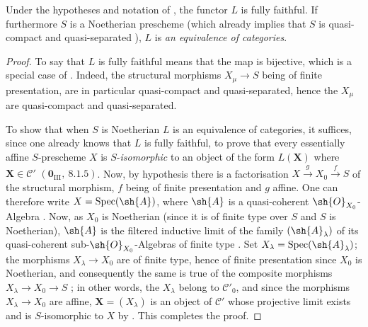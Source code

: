 \begin{proposition}[8.13.5]
\label{IV.8.13.5}
Under the hypotheses and notation of , the functor $L$ is fully faithful.
If furthermore $S$ is a Noetherian prescheme (which already implies that $S$ is quasi-compact and quasi-separated ), $L$ is \emph{an equivalence of categories}.
\end{proposition}

\begin{proof}
To say that $L$ is fully faithful means that the map  is bijective, which is a special case of .
Indeed, the structural morphisms $X_\mu\to S$ being of finite presentation, are in particular quasi-compact and quasi-separated, hence the $X_\mu$ are quasi-compact and quasi-separated.

To show that when $S$ is Noetherian $L$ is an equivalence of categories, it suffices, since one already knows that $L$ is fully faithful, to prove that every essentially affine $S$-prescheme $X$ is $S$-\emph{isomorphic} to an object of the form $L(\mathbf{X})$ where $\mathbf{X}\in\mathcal{C}'$ $(\mathbf{0}_{\text{III}},~8.1.5)$.
Now, by hypothesis there is a factorisation $X\xrightarrow{g}X_0\xrightarrow{f}S$ of the structural morphism, $f$ being of finite presentation and $g$ affine.
One can therefore write $X=\operatorname{Spec}(\sh{A})$, where $\sh{A}$ is a quasi-coherent $\sh{O}_{X_0}$-Algebra .
Now, as $X_0$ is Noetherian (since it is of finite type over $S$ and $S$ is Noetherian), $\sh{A}$ is the filtered inductive limit of the family $(\sh{A}_\lambda)$ of its quasi-coherent sub-$\sh{O}_{X_0}$-Algebras of finite type .
Set $X_\lambda=\operatorname{Spec}(\sh{A}_\lambda)$; the morphisms $X_\lambda\to X_0$ are of finite type, hence of finite presentation since $X_0$ is Noetherian, and consequently the same is true of the composite morphisms $X_\lambda\to X_0\to S$ ; in other words, the $X_\lambda$ belong to $\mathcal{C}'_0$, and since the morphisms $X_\lambda\to X_0$ are affine, $\mathbf{X}=(X_\lambda)$ is an object of $\mathcal{C}'$ whose projective limit exists and is $S$-isomorphic to $X$ by .
This completes the proof.
\end{proof}

